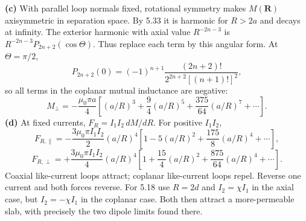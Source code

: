 \textbf{(c)} With parallel loop normals fixed, rotational symmetry
makes $M(\mathbf R)$ axisymmetric in separation space.
By 5.33 it is harmonic for $R>2a$ and decays at infinity.
The exterior harmonic with axial value $R^{-2n-3}$ is
$R^{-2n-3}P_{2n+2}(\cos\Theta)$.
Thus replace each term by this angular form.
At $\Theta=\pi/2$,
\[
P_{2n+2}(0)=(-1)^{n+1}
\frac{(2n+2)!}{2^{2n+2}[(n+1)!]^2},
\]
so all terms in the coplanar mutual inductance are negative:
\[
\boxed{M_\perp=-\frac{\mu_0\pi a}{4}
\left[(a/R)^3+\frac94(a/R)^5+\frac{375}{64}(a/R)^7+\cdots\right].}
\]
\textbf{(d)} At fixed currents, $F_R=I_1I_2\,dM/dR$.
For positive $I_1I_2$,
\[
\boxed{F_{R,\parallel}=-\frac{3\mu_0\pi I_1I_2}{2}
(a/R)^4\left[1-5(a/R)^2+\frac{175}{8}(a/R)^4+\cdots\right],}
\]
\[
\boxed{F_{R,\perp}=+\frac{3\mu_0\pi I_1I_2}{4}
(a/R)^4\left[1+\frac{15}{4}(a/R)^2+\frac{875}{64}(a/R)^4+\cdots\right].}
\]
Coaxial like-current loops attract; coplanar like-current loops repel.
Reverse one current and both forces reverse.
For 5.18 use $R=2d$ and $I_2=\chi I_1$ in the axial case,
but $I_2=-\chi I_1$ in the coplanar case. Both then attract a
more-permeable slab, with precisely the two dipole limits found there.


